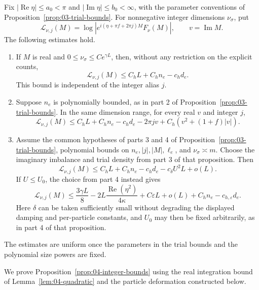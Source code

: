 \begin{proposition}\label{prop:04-integer-bounds}
Fix \( |\operatorname{Re}\eta|\le a_0<\pi\) and
\( |\operatorname{Im}\eta|\le b_0<\infty\), with the parameter
conventions of Proposition~\ref{prop:03-trial-bounds}. For
nonnegative integer dimensions \(\nu_\sigma\), put
\[
 \mathcal L_{\nu,j}(M)
 =\log|e^{i(\eta+\pi f+2\pi j)M}F_\nu(M)|,
 \qquad v=\operatorname{Im}M.
\]
The following estimates hold.
\begin{enumerate}
\item If \(M\) is real and \(0\le\nu_\sigma\le C e^{\gamma L}\),
then, without any restriction on the explicit counts,
\[
 \mathcal L_{\nu,j}(M)\le C_hL+C_hn_e-c_hd_e.
\]
This bound is independent of the integer alias \(j\).
\item Suppose \(n_e\) is polynomially bounded, as in part 2 of
Proposition~\ref{prop:03-trial-bounds}. In the same dimension range,
for every real \(v\) and integer \(j\),
\begin{equation}
 \mathcal L_{\nu,j}(M)\le C_h L+C_h n_e-c_h d_e-2\pi jv
                 +C_h(v^2+(1+f)|v|).
 \label{eq:G-15}
\end{equation}
\item Assume the common hypotheses of parts 3 and 4 of
Proposition~\ref{prop:03-trial-bounds}, polynomial bounds on
\(n_e,|j|,|M|,\ell_e\), and \(\nu_\sigma\asymp m\).
Choose the imaginary imbalance and trial density from part 3 of
that proposition. Then
\begin{equation}
 \mathcal L_{\nu,j}(M)\le C_h L+C_h n_e-c_h d_e-c_\delta U^2 L+o(L).
 \label{eq:G-16}
\end{equation}
If \(U\le U_0\), the choice from part 4 instead gives
\begin{equation}
 \mathcal L_{\nu,j}(M)\le\frac{3\gamma L}{8}
 -2L\frac{\operatorname{Re}(\eta^2)}{4\kappa}
 +C\varepsilon L+o(L)+C_h n_e-c_{h,\varepsilon}d_e.
 \label{eq:G-17}
\end{equation}
Here \(\delta\) can be taken sufficiently small without degrading
the displayed damping and per-particle constants, and \(U_0\) may
then be fixed arbitrarily, as in part 4 of that proposition.
\end{enumerate}
The estimates are uniform once the parameters in the trial bounds
and the polynomial size powers are fixed.
\end{proposition}

We prove Proposition~\ref{prop:04-integer-bounds} using the real integration bound of Lemma~\ref{lem:04-quadratic} and the particle deformation constructed below.

